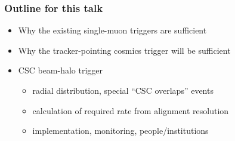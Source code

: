 \documentclass[compress]{beamer}
\begin{document}
\begin{frame}
\begin{center}
\end{center}
\end{frame}


\begin{frame}
\frametitle{Outline for this talk}
\begin{itemize}\setlength{\itemsep}{0.5 cm}
\item Why the existing single-muon triggers are sufficient
\item Why the tracker-pointing cosmics trigger will be sufficient
\item CSC beam-halo trigger

\vspace{0.1 cm}
\begin{itemize}\setlength{\itemsep}{0.25 cm}
\item radial distribution, special ``CSC overlaps'' events
\item calculation of required rate from alignment resolution
\item implementation, monitoring, people/institutions
\end{itemize}
\end{itemize}
\end{frame}
\end{document}
